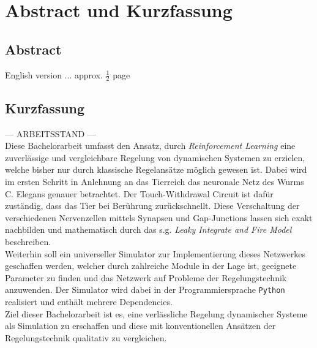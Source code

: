 %
\chapter*{Abstract und Kurzfassung}
%

%
\section*{Abstract}
%

English version ... approx. $\frac{1}{2}$ page

%
\section*{Kurzfassung}
%

{\Large --- ARBEITSSTAND ---}\vspace{1cm}\\
Diese Bachelorarbeit umfasst den Ansatz, durch \textit{Reinforcement Learning} eine zuverlässige und vergleichbare Regelung von dynamischen Systemen zu erzielen, welche bisher nur durch klassische Regelansätze möglich gewesen ist. Dabei wird im ersten Schritt in Anlehnung an das Tierreich das neuronale Netz des Wurms C. Elegans \cite{WormLevelRL} genauer betrachtet. Der Touch-Withdrawal Circuit ist dafür zuständig, dass das Tier bei Berührung zurückschnellt. Diese Verschaltung der verschiedenen Nervenzellen mittels Synapsen und Gap-Junctions lassen sich exakt nachbilden und mathematisch durch das s.g. \textit{Leaky Integrate and Fire Model} beschreiben.\\
Weiterhin soll ein universeller Simulator zur Implementierung dieses Netzwerkes geschaffen werden, welcher durch zahlreiche Module in der Lage ist, geeignete Parameter zu finden und das Netzwerk auf Probleme der Regelungstechnik anzuwenden. Der Simulator wird dabei in der Programmiersprache \texttt{Python} realisiert und enthält mehrere Dependencies.\\
Ziel dieser Bachelorarbeit ist es, eine verlässliche Regelung dynamischer Systeme als Simulation zu erschaffen und diese mit konventionellen Ansätzen der Regelungstechnik qualitativ zu vergleichen.


